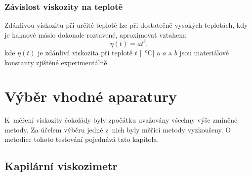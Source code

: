 \documentclass[12pt]{article}
\begin{document}
\subsubsection{Závislost viskozity na teplotě}%

Zdánlivou viskozitu při určité teplotě lze při dostatečně vysokých teplotách, kdy je kakaové máslo dokonale roztavené, aproximovat vztahem:~\cite{article:Rheological_behaviour_chocolate_temeperature}
\begin{equation}
    \eta(t) = at^b\text{,}
\end{equation}
kde $\eta(t)$ je zdánlivá viskozita při teplotě $t$ [\SI{}{\degreeCelsius}] a $a$ a $b$ jsou materiálové konstanty zjištěné experimentálně.

\newpage%
\section{Výběr vhodné aparatury}%

K~měření viskozity čokolády byly zpočátku uvažovány všechny výše zmíněné metody. Za účelem výběru jedné z~nich byly měřicí metody vyzkoušeny. O metodice tohoto testování pojednává tato kapitola.

\subsection{Kapilární viskozimetr}%
\end{document}
